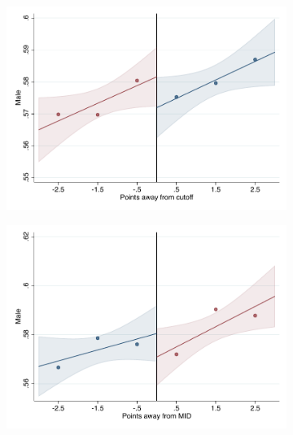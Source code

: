\documentclass[oneside,11pt]{article}
\begin{document}
\begin{figure}[H]
\begin{center}
    \begin{subfigure}{0.475\textwidth}
        \centering
        \includegraphics[width=\textwidth]{04_Figures/rd_plot_tau_hombre_IPN3.pdf}
    \end{subfigure}
    \begin{subfigure}{0.475\textwidth}
        \centering
        \includegraphics[width=\textwidth]{04_Figures/rd_plot_mid_hombre_IPN3.pdf}
    \end{subfigure}


\end{center}
\end{figure}
\end{document}
